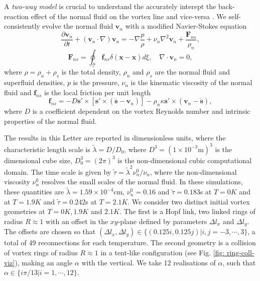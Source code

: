 \documentclass[9pt,twoside]{pnas-new}
\def \s{\mathbf{s}}
\def \v{\mathbf{v}}
\def \x{\mathbf{x}}
\begin{document}
A \emph{two-way model} is crucial to understand the accurately interept the back-reaction effect of the normal fluid on the vortex line and vice-versa \cite{stasiakCrossComponentEnergyTransfer2024}. We self-consistently evolve the normal fluid $\v_n$ with a modified Navier-Stokes equation
\begin{equation}
	\frac{\partial \v_n}{\partial t} + (\v_n\cdot\nabla)\v_n = -\nabla\frac{p}{\rho} + \nu_n\nabla^2\v_n + \frac{\mathbf{F}_{ns}}{\rho_n},
\end{equation}
\begin{equation}
	\mathbf{F}_{ns} = \oint_{\mathcal{T}}\mathbf{f}_{ns}\delta(\x-\x)d\xi, \quad \nabla\cdot\v_n=0,
\end{equation}
where $\rho=\rho_n + \rho_s$ is the total density, $\rho_n$ and $\rho_s$ are the normal fluid and superfluid densities, $p$ is the pressure, $\nu_n$ is the kinematic viscosity of the normal fluid and $\mathbf{f}_{ns}$ is the local friction per unit length \cite{galantucciCoupledNormalFluid2015a}
\begin{equation}
	\mathbf{f}_{ns} = -D\s'\times\left[\s'\times(\dot{\s}-\v_n)\right]-\rho_n\kappa\s'\times(\v_n-\dot{\s}), 
\end{equation}
where $D$ is a coefficient dependent on the vortex Reynolds number and intrinsic properties of the normal fluid.

The results in this Letter are reported in dimensionless units, where the characteristic length scale is $\tilde{\lambda}=D/D_0$, where $D^3=(1\times10^{-3}\text{m})^3$ is the dimensional cube size, $D_0^3=(2\pi)^3$ is the non-dimensional cubic computational domain. The time scale is given by $\tilde{\tau} = \tilde{\lambda}^2\nu_n^0/\nu_n$, where the non-dimensional viscosity $\nu_n^0$ resolves the small scales of the normal fluid. In these simulations, these quantities are $\tilde{\lambda}=1.59\times10^{-4}\text{cm}$, $\nu_n^0=0.16$ and $\tilde{\tau} = 0.183$s at $T=0K$ and at $T=1.9K$ and $\tilde{\tau}=0.242$s at $T=2.1K$.
We consider two distinct initial vortex geometries at $T=0K,1.9K$ and $2.1K$. The first is a Hopf link, two linked rings of radius $R\approx1$ with an offset in the $xy$-plane defined by parameters $\Delta l_x$ and $\Delta l_y$. The offsets are chosen so that $(\Delta l_x, \Delta l _y) \in \lbrace(0.125i,0.125j)|i,j=-3,\cdots,3 \rbrace$, a total of 49 reconnections for each temperature. The second geometry is a collision of vortex rings of radius $R\approx1$ in a tent-like configuration (see Fig. \ref{fig: ring-coll-viz}), making an angle $\alpha$ with the vertical. We take 12 realisations of $\alpha$, such that $\alpha\in\lbrace i\pi/13|i=1,\cdots,12\rbrace$. 
\end{document}
